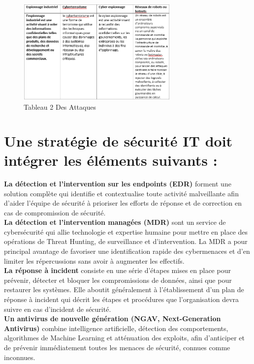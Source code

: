  	\begin{figure}[h]
 		\begin{center}
 		\includegraphics[width=0.7\textwidth]{PhotoMemoire/tableau2_attaques.png}
 		\caption{Tableau 2  Des Attaques}
 		 \end{center}
 	\end{figure}
 	
 
 

\section*{\textbf{Une stratégie de sécurité IT doit intégrer les éléments suivants :}}

\textbf{La détection et l’intervention sur les endpoints (EDR)} forment une solution complète qui identifie et contextualise toute activité malveillante afin d’aider l’équipe de sécurité à prioriser les efforts de réponse et de correction en cas de compromission de sécurité.\\

\textbf{La détection et l’intervention managées (MDR)} sont un service de cybersécurité qui allie technologie et expertise humaine pour mettre en place des opérations de Threat Hunting, de surveillance et d’intervention. La MDR a pour principal avantage de favoriser une identification rapide des cybermenaces et d’en limiter les répercussions sans avoir à augmenter les effectifs.\\

\textbf{La réponse à incident} consiste en une série d’étapes mises en place pour prévenir, détecter et bloquer les compromissions de données, ainsi que pour restaurer les systèmes. Elle aboutit généralement à l’établissement d’un plan de réponse à incident qui décrit les étapes et procédures que l’organisation devra suivre en cas d’incident de sécurité.\\

\textbf{Un antivirus de nouvelle génération (NGAV, Next-Generation Antivirus)} combine intelligence artificielle, détection des comportements, algorithmes de Machine Learning et atténuation des exploits, afin d’anticiper et de prévenir immédiatement toutes les menaces de sécurité, connues comme inconnues.\\

